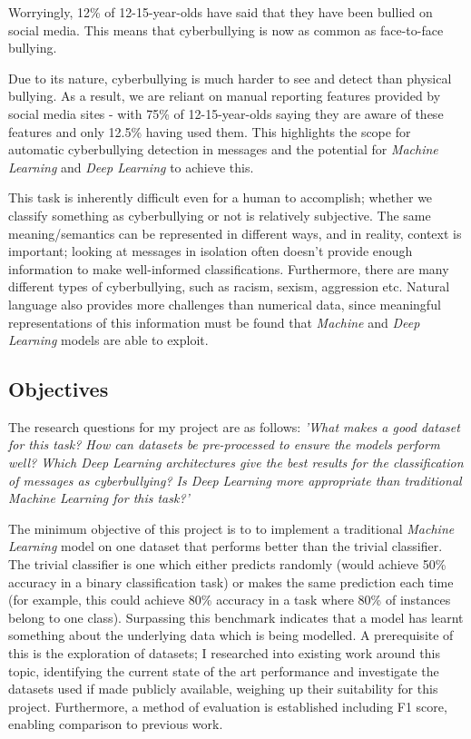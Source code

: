 \documentclass[12pt,a4paper]{article}
\begin{document}
Worryingly, 12\% of 12-15-year-olds have said that they have been bullied on social media. This means that cyberbullying is now as common as face-to-face bullying.

Due to its nature, cyberbullying is much harder to see and detect than physical bullying. As a result, we are reliant on manual reporting features provided by social media sites - with 75\% of 12-15-year-olds saying they are aware of these features \cite[p.5]{Ofcom} and only 12.5\% having used them. This highlights the scope for automatic cyberbullying detection in messages and the potential for \textit{Machine Learning} and \textit{Deep Learning} to achieve this.

This task is inherently difficult even for a human to accomplish; whether we classify something as cyberbullying or not is relatively subjective. The same meaning/semantics can be represented in different ways, and in reality, context is important; looking at messages in isolation often doesn't provide enough information to make well-informed classifications. Furthermore, there are many different types of cyberbullying, such as racism, sexism, aggression etc. Natural language also provides more challenges than numerical data, since meaningful representations of this information must be found that \textit{Machine} and \textit{Deep Learning} models are able to exploit.



\subsection{Objectives}
The research questions for my project are as follows: \newline
\textit{'What makes a good dataset for this task? How can datasets be pre-processed to ensure the models perform well? Which Deep Learning architectures give the best results for the classification of messages as cyberbullying? Is Deep Learning more appropriate than traditional Machine Learning for this task?'} \newline

The minimum objective of this project is to to implement a traditional \textit{Machine Learning} model on one dataset that performs better than the trivial classifier. The trivial classifier is one which either predicts randomly (would achieve 50\% accuracy in a binary classification task) or makes the same prediction each time (for example, this could achieve 80\% accuracy in a task where 80\% of instances belong to one class). Surpassing this benchmark indicates that a model has learnt something about the underlying data which is being modelled. A prerequisite of this is the exploration of datasets; I researched into existing work around this topic, identifying the current state of the art performance and investigate the datasets used if made publicly available, weighing up their suitability for this project. Furthermore, a method of evaluation is established  including F1 score, enabling comparison to previous work.
\end{document}
